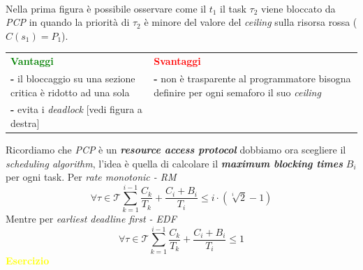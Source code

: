 \\
Nella prima figura è possibile osservare come il $t_1$ il task $\tau_2$ viene bloccato da \textit{PCP} in quando la priorità di $\tau_2$ è minore del valore del \textit{ceiling} sulla risorsa rossa ($C(s_1) = P_1$).
\begin{center}
    \begin{tabular}{ p{7.25cm} | p{7.25cm} }
        \textcolor{green}{\textbf{Vantaggi}} & \textcolor{red}{\textbf{Svantaggi}} \\
        \textbf{-} il bloccaggio su una sezione critica è ridotto ad una sola & \textbf{-} non è trasparente al programmatore bisogna definire per ogni semaforo il suo \textit{ceiling} \\
        \textbf{-} evita i \textit{deadlock} [vedi figura a destra] &  \\
    \end{tabular}
\end{center}
Ricordiamo che \textit{PCP} è un \textbf{\textit{resource access protocol}} dobbiamo ora scegliere il \textit{scheduling algorithm}, l'idea è quella di calcolare il \textbf{\textit{maximum blocking times}} $B_i$ per ogni task. Per \textit{rate monotonic - RM} \[\forall \tau \in \mathcal{T} \sum_{k=1}^{i-1}\frac{C_k}{T_k} + \frac{C_i + B_i}{T_i} \leq i \cdot (\sqrt[i]{2} - 1)\]
Mentre per \textit{earliest deadline first - EDF} \[\forall \tau \in \mathcal{T} \sum_{k=1}^{i-1}\frac{C_k}{T_k} + \frac{C_i + B_i}{T_i} \leq 1\]
\textcolor{yellow}{\textbf{Esercizio}}


